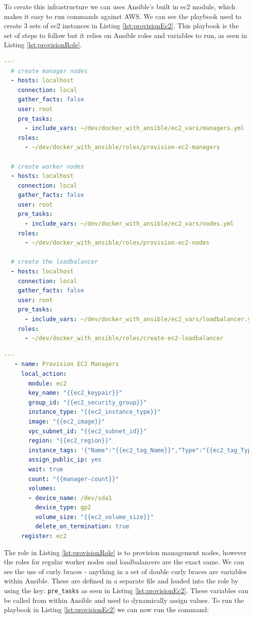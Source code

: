 \documentclass{article}
\begin{document}
To create this infrastructure we can uses Ansible's built in ec2 module, which makes it easy to run commands against AWS. We can see the playbook used to create 3 sets of ec2 instances in Listing \ref{lst:provisionEc2}. This playbook is the set of steps to follow but it relies on Ansible roles and variables to run, as seen in Listing \ref{lst:provisionRole}.

\begin{lstlisting}[float,floatplacement=H,language=yaml,caption={create-instances.yml},label={lst:provisionEc2},basicstyle=\small]
  ---
  # create manager nodes 
  - hosts: localhost
    connection: local
    gather_facts: false
    user: root
    pre_tasks:
      - include_vars: ~/dev/docker_with_ansible/ec2_vars/managers.yml
    roles:
      - ~/dev/docker_with_ansible/roles/provision-ec2-managers

  # create worker nodes
  - hosts: localhost
    connection: local
    gather_facts: false
    user: root
    pre_tasks:
      - include_vars: ~/dev/docker_with_ansible/ec2_vars/nodes.yml
    roles:
      - ~/dev/docker_with_ansible/roles/provision-ec2-nodes
      
  # create the loadbalancer
  - hosts: localhost
    connection: local
    gather_facts: false
    user: root
    pre_tasks:
      - include_vars: ~/dev/docker_with_ansible/ec2_vars/loadbalancer.yml
    roles:
      - ~/dev/docker_with_ansible/roles/create-ec2-loadbalancer
\end{lstlisting}

\begin{lstlisting}[float,floatplacement=H,language=yaml,caption={provision-ec2-managers.yml},label={lst:provisionRole},basicstyle=\small]
  ---
   - name: Provision EC2 Managers
     local_action:
       module: ec2
       key_name: "{{ec2_keypair}}"
       group_id: "{{ec2_security_group}}"
       instance_type: "{{ec2_instance_type}}"
       image: "{{ec2_image}}"
       vpc_subnet_id: "{{ec2_subnet_id}}"
       region: "{{ec2_region}}"
       instance_tags: '{"Name":"{{ec2_tag_Name}}","Type":"{{ec2_tag_Type}}","Environment":"{{ec2_tag_Environment}}"}'
       assign_public_ip: yes
       wait: true
       count: "{{manager-count}}"
       volumes: 
       - device_name: /dev/sda1
         device_type: gp2
         volume_size: "{{ec2_volume_size}}"
         delete_on_termination: true
     register: ec2
\end{lstlisting}

The role in Listing \ref{lst:provisionRole} is to provision management nodes, however the roles for regular worker nodes and loadbalancers are the exact same. We can see the use of curly braces - anything in a set of double curly braces are variables within Ansible. These are defined in a separate file and loaded into the role by using the key: \texttt{pre\_tasks} as seen in Listing \ref{lst:provisionEc2}. These variables can be called from within Ansible and used to dynamically assign values. To run the playbook in Listing \ref{lst:provisionEc2} we can now run the command:
\end{document}
